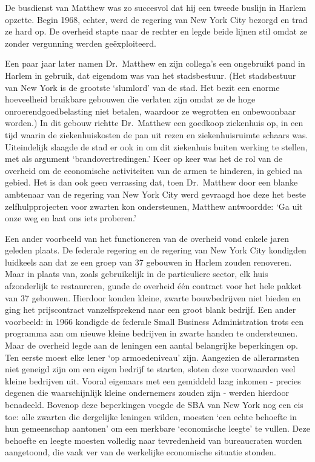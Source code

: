 \documentclass[
  a5paper,
  smalldemyvopaper,10pt,twoside,onecolumn,openright,extrafontsizes,hidelinks]{memoir}
\begin{document}
De busdienst van Matthew was zo succesvol dat hij een tweede buslijn in
Harlem opzette. Begin 1968, echter, werd de regering van New York City
bezorgd en trad ze hard op. De overheid stapte naar de rechter en legde
beide lijnen stil omdat ze zonder vergunning werden geëxploiteerd.

Een paar jaar later namen Dr.~Matthew en zijn collega's een ongebruikt
pand in Harlem in gebruik, dat eigendom was van het stadsbestuur. (Het
stadsbestuur van New York is de grootste `slumlord' van de stad. Het
bezit een enorme hoeveelheid bruikbare gebouwen die verlaten zijn omdat
ze de hoge onroerendgoedbelasting niet betalen, waardoor ze wegrotten en
onbewoonbaar worden.) In dit gebouw richtte Dr.~Matthew een goedkoop
ziekenhuis op, in een tijd waarin de ziekenhuiskosten de pan uit rezen
en ziekenhuisruimte schaars was. Uiteindelijk slaagde de stad er ook in
om dit ziekenhuis buiten werking te stellen, met als argument
`brandovertredingen.' Keer op keer was het de rol van de overheid om de
economische activiteiten van de armen te hinderen, in gebied na gebied.
Het is dan ook geen verrassing dat, toen Dr.~Matthew door een blanke
ambtenaar van de regering van New York City werd gevraagd hoe deze het
beste zelfhulpprojecten voor zwarten kon ondersteunen, Matthew
antwoordde: `Ga uit onze weg en laat ons iets proberen.'

Een ander voorbeeld van het functioneren van de overheid vond enkele
jaren geleden plaats. De federale regering en de regering van New York
City kondigden luidkeels aan dat ze een groep van 37 gebouwen in Harlem
zouden renoveren. Maar in plaats van, zoals gebruikelijk in de
particuliere sector, elk huis afzonderlijk te restaureren, gunde de
overheid één contract voor het hele pakket van 37 gebouwen. Hierdoor
konden kleine, zwarte bouwbedrijven niet bieden en ging het
prijscontract vanzelfsprekend naar een groot blank bedrijf. Een ander
voorbeeld: in 1966 kondigde de federale Small Business Administration
trots een programma aan om nieuwe kleine bedrijven in zwarte handen te
ondersteunen. Maar de overheid legde aan de leningen een aantal
belangrijke beperkingen op. Ten eerste moest elke lener `op
armoedeniveau' zijn. Aangezien de allerarmsten niet geneigd zijn om een
eigen bedrijf te starten, sloten deze voorwaarden veel kleine bedrijven
uit. Vooral eigenaars met een gemiddeld laag inkomen - precies degenen
die waarschijnlijk kleine ondernemers zouden zijn - werden hierdoor
benadeeld. Bovenop deze beperkingen voegde de SBA van New York nog een
eis toe: alle zwarten die dergelijke leningen wilden, moesten `een echte
behoefte in hun gemeenschap aantonen' om een merkbare `economische
leegte' te vullen. Deze behoefte en leegte moesten volledig naar
tevredenheid van bureaucraten worden aangetoond, die vaak ver van de
werkelijke economische situatie stonden.
\end{document}
